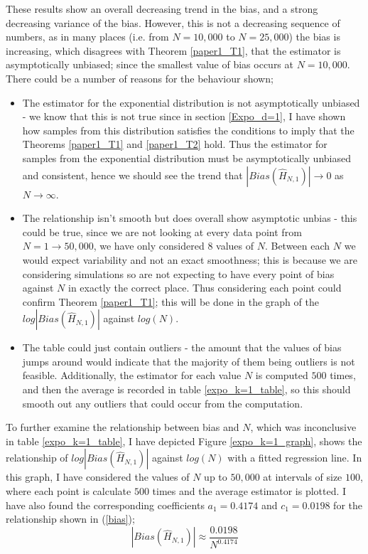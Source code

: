 \documentclass{report}
\begin{document}
These results show an overall decreasing trend in the bias, and a strong decreasing variance of the bias. However, this is not a decreasing sequence of numbers, as in many places (i.e. from $N=10,000$ to $N=25,000$) the bias is increasing, which disagrees with Theorem \ref{paper1_T1}, that the estimator is asymptotically unbiased; since the smallest value of bias occurs at $N=10,000$. There could be a number of reasons for the behaviour shown;
\begin{itemize}
\item The estimator for the exponential distribution is not asymptotically unbiased - we know that this is not true since in section \ref{Expo_d=1}, I have shown how samples from this distribution satisfies the conditions to imply that the Theorems \ref{paper1_T1} and \ref{paper1_T2} hold. Thus the estimator for samples from the exponential distribution must be asymptotically unbiased and consistent, hence we should see the trend that $|Bias(\hat{H}_{N, 1})| \to 0$ as $N \to \infty$.
\item The relationship isn't smooth but does overall show asymptotic unbias -  this could be true, since we are not looking at every data point from $N = 1 \to 50,000$, we have only considered 8 values of $N$. Between each $N$ we would expect variability and not an exact smoothness; this is because we are considering simulations so are not expecting to have every point of bias against $N$ in exactly the correct place. Thus considering each point could confirm Theorem \ref{paper1_T1}; this will be done in the graph of the $log |Bias(\hat{H}_{N, 1})|$ against $log(N)$.
\item The table could just contain outliers - the amount that the values of bias jumps around would indicate that the majority of them being outliers is not feasible. Additionally, the estimator for each value $N$ is computed $500$ times, and then the average is recorded in table \ref{expo_k=1_table}, so this should smooth out any outliers that could occur from the computation.
\end{itemize}

To further examine the relationship between bias and $N$, which was inconclusive in table \ref{expo_k=1_table}, I have depicted Figure \ref{expo_k=1_graph}, shows the relationship of $log|Bias(\hat{H}_{N, 1})|$ against $log(N)$ with a fitted regression line. In this graph, I have considered the values of $N$ up to $50,000$ at intervals of size $100$, where each point is calculate $500$ times and the average estimator is plotted. I have also found the corresponding coefficients $a_{1} = 0.4174$ and $c_{1} = 0.0198$ for the relationship shown in (\ref{bias});
\begin{equation}
|Bias(\hat{H}_{N, 1})| \approx \frac{0.0198}{N^{0.4174}}\nonumber
\end{equation}
\end{document}
